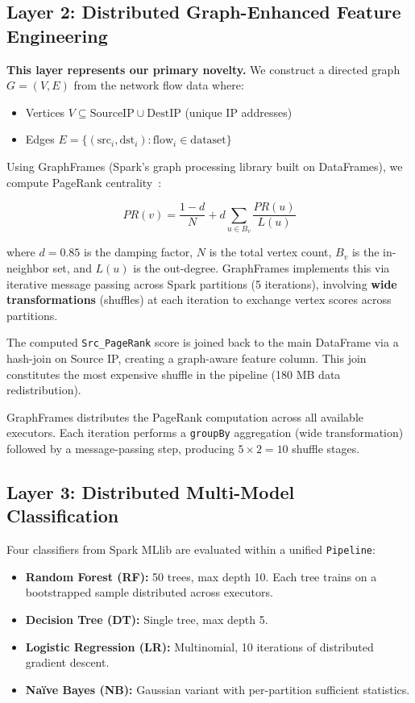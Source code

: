 \documentclass[conference]{IEEEtran}
\begin{document}
\subsection{Layer 2: Distributed Graph-Enhanced Feature Engineering}

\textbf{This layer represents our primary novelty.} We construct a directed graph $G = (V, E)$ from the network flow data where:

\begin{itemize}
    \item Vertices $V \subseteq \text{SourceIP} \cup \text{DestIP}$ (unique IP addresses)
    \item Edges $E = \{(\text{src}_i, \text{dst}_i) : \text{flow}_i \in \text{dataset}\}$
\end{itemize}

Using GraphFrames (Spark's graph processing library built on DataFrames), we compute PageRank centrality~\cite{b12}:

\begin{equation}
    PR(v) = \frac{1-d}{N} + d \sum_{u \in B_v} \frac{PR(u)}{L(u)}
\end{equation}

where $d = 0.85$ is the damping factor, $N$ is the total vertex count, $B_v$ is the in-neighbor set, and $L(u)$ is the out-degree. GraphFrames implements this via iterative message passing across Spark partitions (5 iterations), involving \textbf{wide transformations} (shuffles) at each iteration to exchange vertex scores across partitions.

The computed \texttt{Src\_PageRank} score is joined back to the main DataFrame via a hash-join on Source IP, creating a graph-aware feature column. This join constitutes the most expensive shuffle in the pipeline (180 MB data redistribution).

GraphFrames distributes the PageRank computation across all available executors. Each iteration performs a \texttt{groupBy} aggregation (wide transformation) followed by a message-passing step, producing $5 \times 2 = 10$ shuffle stages.

\subsection{Layer 3: Distributed Multi-Model Classification}

Four classifiers from Spark MLlib are evaluated within a unified \texttt{Pipeline}:

\begin{itemize}
    \item \textbf{Random Forest (RF):} 50 trees, max depth 10. Each tree trains on a bootstrapped sample distributed across executors.
    \item \textbf{Decision Tree (DT):} Single tree, max depth 5.
    \item \textbf{Logistic Regression (LR):} Multinomial, 10 iterations of distributed gradient descent.
    \item \textbf{Na\"ive Bayes (NB):} Gaussian variant with per-partition sufficient statistics.
\end{itemize}
\end{document}
